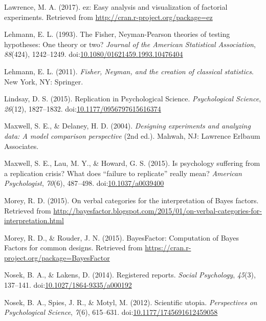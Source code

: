 \documentclass[,man, mask]{apa6}
\theoremstyle{definition}
\theoremstyle{definition}
\theoremstyle{definition}
\theoremstyle{remark}
\begin{document}
\hypertarget{ref-Lawrence2017}{}
Lawrence, M. A. (2017). ez: Easy analysis and visualization of factorial
experiments. Retrieved from \url{http://cran.r-project.org/package=ez}

\hypertarget{ref-Lehmann1993}{}
Lehmann, E. L. (1993). The Fisher, Neyman-Pearson theories of testing
hypotheses: One theory or two? \emph{Journal of the American Statistical
Association}, \emph{88}(424), 1242--1249.
doi:\href{https://doi.org/10.1080/01621459.1993.10476404}{10.1080/01621459.1993.10476404}

\hypertarget{ref-Lehmann2011}{}
Lehmann, E. L. (2011). \emph{Fisher, Neyman, and the creation of
classical statistics}. New York, NY: Springer.

\hypertarget{ref-Lindsay2015}{}
Lindsay, D. S. (2015). Replication in Psychological Science.
\emph{Psychological Science}, \emph{26}(12), 1827--1832.
doi:\href{https://doi.org/10.1177/0956797615616374}{10.1177/0956797615616374}

\hypertarget{ref-Maxwell2004}{}
Maxwell, S. E., \& Delaney, H. D. (2004). \emph{Designing experiments
and analyzing data: A model comparison perspective} (2nd ed.). Mahwah,
NJ: Lawrence Erlbaum Associates.

\hypertarget{ref-Maxwell2015}{}
Maxwell, S. E., Lau, M. Y., \& Howard, G. S. (2015). Is psychology
suffering from a replication crisis? What does ``failure to replicate''
really mean? \emph{American Psychologist}, \emph{70}(6), 487--498.
doi:\href{https://doi.org/10.1037/a0039400}{10.1037/a0039400}

\hypertarget{ref-Morey2015c}{}
Morey, R. D. (2015). On verbal categories for the interpretation of
Bayes factors. Retrieved from
\url{http://bayesfactor.blogspot.com/2015/01/on-verbal-categories-for-interpretation.html}

\hypertarget{ref-Morey2015b}{}
Morey, R. D., \& Rouder, J. N. (2015). BayesFactor: Computation of Bayes
Factors for common designs. Retrieved from
\url{https://cran.r-project.org/package=BayesFactor}

\hypertarget{ref-Nosek2014}{}
Nosek, B. A., \& Lakens, D. (2014). Registered reports. \emph{Social
Psychology}, \emph{45}(3), 137--141.
doi:\href{https://doi.org/10.1027/1864-9335/a000192}{10.1027/1864-9335/a000192}

\hypertarget{ref-Nosek2012}{}
Nosek, B. A., Spies, J. R., \& Motyl, M. (2012). Scientific utopia.
\emph{Perspectives on Psychological Science}, \emph{7}(6), 615--631.
doi:\href{https://doi.org/10.1177/1745691612459058}{10.1177/1745691612459058}
\end{document}
